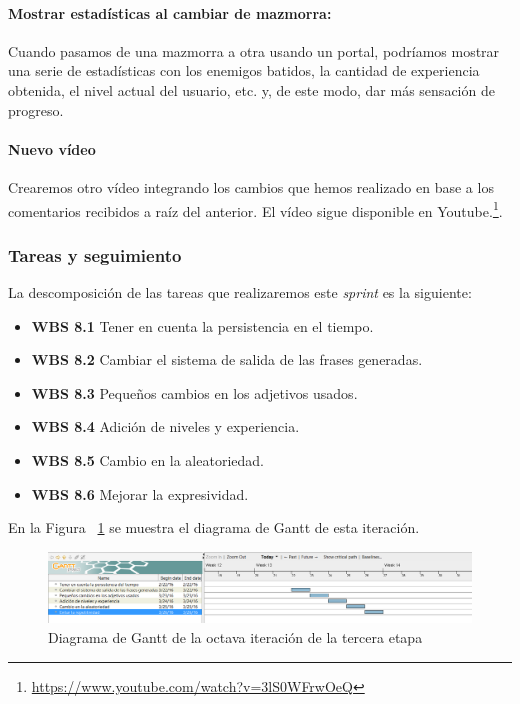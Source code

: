 \paragraph{Mostrar estadísticas al cambiar de mazmorra:} Cuando pasamos de una mazmorra a otra usando un portal, podríamos mostrar una serie de estadísticas con los enemigos batidos, la cantidad de experiencia obtenida, el nivel actual del usuario, etc. y, de este modo, dar más sensación de progreso.

\paragraph {Nuevo vídeo} Crearemos otro vídeo integrando los cambios que hemos realizado en base a los comentarios recibidos a raíz del anterior. El vídeo sigue disponible en Youtube.\footnote{\url{https://www.youtube.com/watch?v=3lS0WFrwOeQ}}.

\subsubsection{Tareas y seguimiento}

La descomposición de las tareas que realizaremos este \textit{sprint} es la siguiente:

\begin{itemize}
  \item \textbf{WBS 8.1} Tener en cuenta la persistencia en el tiempo.
  \item \textbf{WBS 8.2} Cambiar el sistema de salida de las frases generadas.
  \item \textbf{WBS 8.3} Pequeños cambios en los adjetivos usados.
  \item \textbf{WBS 8.4} Adición de niveles y experiencia.
  \item \textbf{WBS 8.5} Cambio en la aleatoriedad.
  \item \textbf{WBS 8.6} Mejorar la expresividad.
\end{itemize}

\noindent En la Figura ~\ref{fig:sec3it8} se muestra el diagrama de Gantt de esta iteración.

\begin{figure}
    \includegraphics[width=\textwidth,height=\textheight,keepaspectratio]{./img/sec3it8.png}
  \caption{Diagrama de Gantt de la octava iteración de la tercera etapa}
  \label{fig:sec3it8}
\end{figure}

